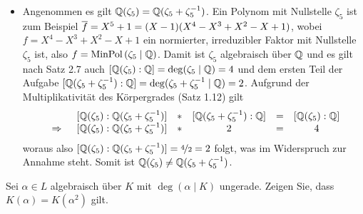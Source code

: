 \begin{exercisePage}
\begin{itemize}[leftmargin=*]
        \item Angenommen es gilt $\mathbb{Q}(\zeta_5) = \mathbb{Q}(\zeta_5 + \zeta_5^{-1})$. Ein Polynom mit Nullstelle $\zeta_5$ ist zum Beispiel $\overline{f} = X^5 + 1 = (X - 1)(X^4 - X^3 + X^2 - X + 1)$, wobei $f = X^4 - X^3 + X^2 - X + 1$ ein normierter, irreduzibler Faktor mit Nullstelle $\zeta_5$ ist, also $f = \operatorname{MinPol}\left( \zeta_5 \mathrel{|} \mathbb{Q}\right)$. Damit ist $\zeta_5$ algebraisch über $\mathbb{Q}$ und es gilt nach Satz 2.7 auch $[\mathbb{Q}(\zeta_5) : \mathbb{Q}] = \deg(\zeta_5 \mid \mathbb{Q}) = 4$ und dem ersten Teil der Aufgabe $[\mathbb{Q}(\zeta_5 + \zeta_5^{-1}) : \mathbb{Q}] = \deg( \zeta_5 + \zeta_5^{-1} \mid \mathbb{Q}) = 2$. Aufgrund der Multiplikativität des Körpergrades (Satz 1.12) gilt
        \begin{equation*}
            \begin{array}{rccccc}
            & [\Q(\zeta_5) : \Q(\zeta_5 + \zeta_5^{-1})] & * & [\Q(\zeta_5 + \zeta_5^{-1}) : \Q] & = & [ \Q( \zeta_5 ) : \Q ] \\%
            \follows & \lbrack \Q ( \zeta_5 ) : \Q ( \zeta_5 + \zeta_5^{-1} ) \rbrack & * & 2 & = & 4 \\
            \end{array}
        \end{equation*}
        woraus also $[\Q(\zeta_5) : \Q(\zeta_5 + \zeta_5^{-1})] = \lfrac{4}{2} = 2$ folgt, was im Widerspruch zur Annahme steht. Somit ist $\mathbb{Q}(\zeta_5) \neq \mathbb{Q}(\zeta_5 + \zeta_5^{-1})$.       
    \end{itemize}

    
    \begin{exercise}
        Sei $\alpha \in L$ algebraisch über $K$ mit $\deg( \alpha \mid K)$ ungerade. Zeigen Sie, dass $K(\alpha) = K(\alpha^2)$ gilt.
    \end{exercise}


\end{exercisePage}
